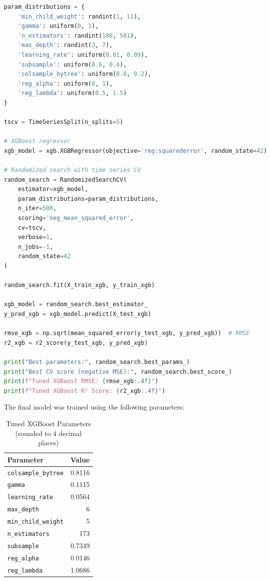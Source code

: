 \begin{lstlisting}[language=Python, caption={Training the XGBoost Model}, label={lst:xgboost-training}]
param_distributions = {
    'min_child_weight': randint(1, 11),
    'gamma': uniform(0, 1),
    'n_estimators': randint(100, 501),
    'max_depth': randint(3, 7),
    'learning_rate': uniform(0.01, 0.09),
    'subsample': uniform(0.6, 0.4),
    'colsample_bytree': uniform(0.8, 0.2),
    'reg_alpha': uniform(0, 1),
    'reg_lambda': uniform(0.5, 1.5)
}

tscv = TimeSeriesSplit(n_splits=5)

# XGBoost regressor
xgb_model = xgb.XGBRegressor(objective='reg:squarederror', random_state=42)

# Randomized search with time series CV
random_search = RandomizedSearchCV(
    estimator=xgb_model,
    param_distributions=param_distributions,
    n_iter=500,
    scoring='neg_mean_squared_error',
    cv=tscv,
    verbose=1,
    n_jobs=-1,
    random_state=42
)

random_search.fit(X_train_xgb, y_train_xgb)

xgb_model = random_search.best_estimator_
y_pred_xgb = xgb_model.predict(X_test_xgb)

rmse_xgb = np.sqrt(mean_squared_error(y_test_xgb, y_pred_xgb))  # RMSE
r2_xgb = r2_score(y_test_xgb, y_pred_xgb)

print("Best parameters:", random_search.best_params_)
print("Best CV score (negative MSE):", random_search.best_score_)
print(f"Tuned XGBoost RMSE: {rmse_xgb:.4f}")
print(f"Tuned XGBoost R² Score: {r2_xgb:.4f}")
\end{lstlisting}

The final model was trained using the following parameters:
\begin{table}[H]
\centering
\caption{Tuned XGBoost Parameters (rounded to 4 decimal places)}
\label{tab:xgboost-parameters}
\begin{tabular}{lr}
\toprule
\textbf{Parameter} & \textbf{Value} \\
\midrule
\texttt{colsample\_bytree} & 0.8116 \\
\texttt{gamma} & 0.1115 \\
\texttt{learning\_rate} & 0.0564 \\
\texttt{max\_depth} & 6 \\
\texttt{min\_child\_weight} & 5 \\
\texttt{n\_estimators} & 173 \\
\texttt{subsample} & 0.7349 \\
\texttt{reg\_alpha} & 0.0146 \\
\texttt{reg\_lambda} & 1.0686 \\
\bottomrule
\end{tabular}
\end{table}

